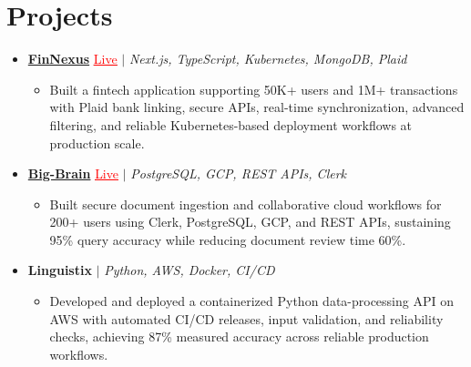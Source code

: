 \documentclass[letterpaper,10pt]{article}
\newcommand{\itemTail}{\vspace{-4pt}}
\newcommand{\projGap}{\vspace{3pt}}
\newcommand{\resumeItem}[1]{\item\small{{#1 \itemTail}}}
\newcommand{\resumeProjectHeading}[1]{\item \small #1 \vspace{-2pt}}
\newcommand{\resumeProjectLink}[2]{\href{#1}{\textcolor{red}{\underline{#2}}}}
\newcommand{\resumeSubHeadingListStart}{\begin{itemize}[leftmargin=0.0in, label={}]}
\newcommand{\resumeSubHeadingListEnd}{\end{itemize}}
\newcommand{\resumeProjItemListStart}{\begin{itemize}[leftmargin=0.15in,label=\textbullet,itemsep=3pt,topsep=0pt,parsep=0pt,partopsep=0pt]}
\newcommand{\resumeProjItemListEnd}{\end{itemize}\vspace{-4pt}}
\begin{document}
\section{Projects}
\resumeSubHeadingListStart
\vspace{-2pt}
\resumeProjectHeading{\href{https://fin-nexus.vercel.app/}{\textbf{FinNexus}} \resumeProjectLink{https://fin-nexus.vercel.app/}{Live} $|$ \emph{Next.js, TypeScript, Kubernetes, MongoDB, Plaid}}
\resumeProjItemListStart
\resumeItem{Built a fintech application supporting 50K+ users and 1M+ transactions with Plaid bank linking, secure APIs, real-time synchronization, advanced filtering, and reliable Kubernetes-based deployment workflows at production scale.}
\resumeProjItemListEnd
\projGap
\resumeProjectHeading{\href{https://big-brain-pied.vercel.app/}{\textbf{Big-Brain}} \resumeProjectLink{https://big-brain-pied.vercel.app/}{Live} $|$ \emph{PostgreSQL, GCP, REST APIs, Clerk}}
\resumeProjItemListStart
\resumeItem{Built secure document ingestion and collaborative cloud workflows for 200+ users using Clerk, PostgreSQL, GCP, and REST APIs, sustaining 95\% query accuracy while reducing document review time 60\%.}
\resumeProjItemListEnd
\projGap
\resumeProjectHeading{\textbf{Linguistix} $|$ \emph{Python, AWS, Docker, CI/CD}}
\resumeProjItemListStart
\resumeItem{Developed and deployed a containerized Python data-processing API on AWS with automated CI/CD releases, input validation, and reliability checks, achieving 87\% measured accuracy across reliable production workflows.}
\resumeProjItemListEnd
\resumeSubHeadingListEnd
\end{document}
